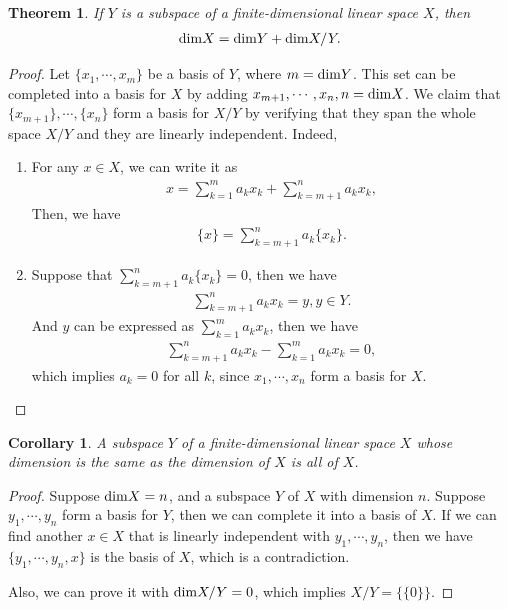 \documentclass[11pt]{book}
\newtheorem{theorem}{Theorem}[chapter]
\newtheorem{corollary}{Corollary}[theorem]
\theoremstyle{definition}
\numberwithin{equation}{chapter}
\begin{document}
\medskip

\begin{theorem}\label{theorem_quotient_dim}
If $Y$ is a subspace of a finite-dimensional linear space $X$, then
\begin{align*}
    {\rm dim}X = {\rm dim}Y + {\rm dim}X/Y.
\end{align*}
\end{theorem}
\begin{proof}
Let $\{x_1, \cdots, x_m\}$ be a basis of $Y$, where $m = {\rm dim}Y$. This set can be completed into a basis for $X$ by adding $x_{m+1}, \cdots, x_n, n = {\rm dim}X$. We claim that $\{x_{m+1}\}, \cdots, \{x_n\}$ form a basis for $X/Y$ by  verifying that they span the whole space $X/Y$ and they are linearly independent. Indeed,
\begin{enumerate}[label=(\alph*)]
    \item For any $x\in X$, we can write it as 
    \begin{align*}
        x = \sum^m_{k=1}a_k x_k + \sum^{n}_{k=m+1}a_k x_k,
    \end{align*}
    Then, we have 
    \begin{align*}
        \{x\} = \sum^{n}_{k=m+1}a_k \{x_k\}.
    \end{align*}
    \item Suppose that $\sum^{n}_{k=m+1}a_k \{x_k\} = 0$, then we have 
    \begin{align*}
        \sum^{n}_{k=m+1}a_k x_k = y, y\in Y.
    \end{align*}
    And $y$ can be expressed as $\sum^{m}_{k=1}a_k x_k$, then we have 
    \begin{align*}
        \sum^{n}_{k=m+1}a_k x_k - \sum^{m}_{k=1}a_k x_k = 0,
    \end{align*}
    which implies $a_k = 0$ for all $k$, since $x_1, \cdots, x_n$ form a basis for $X$.
\end{enumerate}
\end{proof}


\begin{corollary}
A subspace $Y$ of a finite-dimensional linear space $X$ whose dimension is the same as the dimension of $X$ is all of $X$.
\end{corollary}
\begin{proof}
Suppose ${\rm dim}X = n$, and a subspace $Y$ of $X$ with dimension $n$. Suppose $y_1,\cdots,y_n$ form a basis for $Y$, then we can complete it into a basis of $X$. If we can find another $x\in X$ that is linearly independent with $y_1,\cdots,y_n$, then we have $\{y_1,\cdots,y_n, x\}$ is the basis of $X$, which is a contradiction. 

Also, we can prove it with ${\rm dim}X/Y = 0$, which implies $X/Y = \{\{0\}\}$.
\end{proof}
\end{document}
